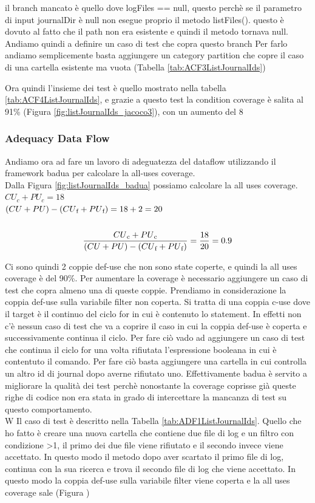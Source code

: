 \documentclass[12pt, a4paper]{article}
\begin{document}
il branch mancato è quello dove logFiles == null, questo perchè se il parametro di input journalDir
 è null non esegue proprio il metodo listFiles().
questo è dovuto al fatto che il path non era esistente e quindi il metodo tornava null.
Andiamo quindi a definire un caso di test che copra questo branch
Per farlo andiamo semplicemente basta aggiungere un category partition che copre il caso di una cartella esistente ma vuota
(Tabella \ref{tab:ACF3ListJournalIds})

Ora quindi l'insieme dei test è quello mostrato nella tabella \ref{tab:ACF4ListJournalIds}, 
e grazie a questo test la condition coverage è salita al 91\% (Figura \ref{fig:listJournalIds_jacoco3}),
con un aumento del 8%

 \subsubsection{Adequacy Data Flow}

 Andiamo ora ad fare un lavoro di adeguatezza del dataflow utilizzando il framework badua per calcolare la all-uses coverage. \\
Dalla Figura \ref{fig:listJournalIds_badua} possiamo calcolare la all uses coverage. \\
\(CU_c + PU_c = 18\) \\
\( (CU + PU) - (CU\textsubscript{f} + PU\textsubscript{f}) = 18 + 2 = 20\) \\ \\
\[\frac{{CU\textsubscript{c} + PU\textsubscript{c}}}{{(CU + PU) - (CU\textsubscript{f} + PU\textsubscript{f})}} = \frac{{18}}{{20}} = 0.9\]

Ci sono quindi 2 coppie def-use che non sono state coperte, e quindi la all uses coverage è del 90\%.
Per aumentare la coverage è necessario aggiungere un caso di test che copra almeno una di queste coppie.
Prendiamo in considerazione la coppia def-use sulla variabile filter non coperta. Si tratta di una coppia c-use 
dove il target è il continuo del ciclo for in cui è contenuto lo statement. In effetti non c'è nessun caso di test
che va a coprire il caso in cui la coppia def-use è coperta e successivamente continua il ciclo.
Per fare ciò vado ad aggiungere un caso di test che continua il ciclo for una volta rifiutata 
l'espressione booleana in cui è contentuto il comando. Per fare ciò basta aggiungere una cartella in cui controlla
un altro id di journal dopo averne rifiutato uno. Effettivamente badua è servito a migliorare la qualità dei 
test perchè nonostante la coverage
coprisse già queste righe di codice non era stata in grado di intercettare la mancanza
di test su questo comportamento. \\W
Il caso di test è descritto nella Tabella \ref{tab:ADF1ListJournalIds}. Quello che ho fatto è creare una nuova
cartella che contiene due file di log e un filtro con condizione >1, il primo dei due file viene rifiutato 
e il secondo invece viene accettato. In questo modo il metodo dopo aver scartato il primo file di log, continua
con la sua ricerca e trova il secondo file di log che viene accettato. In questo modo la coppia
def-use sulla variabile filter viene coperta e la all uses coverage sale (Figura )
\end{document}
